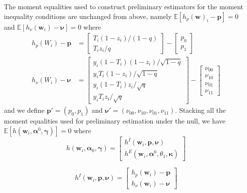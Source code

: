 \documentclass[12pt]{article}
\begin{document}
The moment equalities used to construct preliminary estimators for the moment inequality conditions are unchanged from above, namely $\mathbb{E}\left[ h_p(\mathbf{w})_i - \mathbf{p} \right] = 0$ and $\mathbb{E}\left[ h_\nu(\mathbf{w}_i) - \boldsymbol{\nu} \right] = 0$ where
\begin{align*}
h_p(W_i) - \mathbf{p} &= \left[
\begin{array}{l}
  T_i (1-z_i)/(1-q)\\ 
  T_i z_i / q 
\end{array}
\right] - \left[
\begin{array}{c}
  p_0 \\ p_1
\end{array}
\right]\\
h_\nu(W_i) - \boldsymbol{\nu} &= \left[
\begin{array}{l}
  y_i (1 - T_i) (1-z_i) / \sqrt{1-q}\\ 
  y_i T_i (1-z_i) / \sqrt{1-q} \\
  y_i (1 - T_i) z_i / \sqrt{q} \\
  y_i T_i z_i/\sqrt{q} 
\end{array}
\right] - \left[
\begin{array}{c}
  \nu_{00} \\
  \nu_{10} \\
  \nu_{01} \\
  \nu_{11} 
\end{array}
\right]
\end{align*}
and we define $\mathbf{p}'= (p_0, p_1)$ and $\boldsymbol{\nu}' = (\nu_{00}, \nu_{10}, \nu_{01}, \nu_{11})$.
Stacking all the moment equalities used for preliminary estimation under the null, we have $\mathbb{E}[h(\mathbf{w}_i, \boldsymbol{\alpha}^0, \boldsymbol{\gamma})] = 0$ where
\[
  h\left( \mathbf{w}_i, \boldsymbol{\alpha}_0,\boldsymbol{\gamma} \right) = \left[
  \begin{array}{l}
    h^I(\mathbf{w}_i, \mathbf{p}, \boldsymbol{\nu}) \\
    h^E(\mathbf{w}_i, \boldsymbol{\alpha}^0, \theta_1, \boldsymbol{\kappa}) 
  \end{array}
\right]
\]

\[
  h^I\left( \mathbf{w}_i, \mathbf{p}, \boldsymbol{\nu} \right) = \left[
  \begin{array}{l}
    h_p(\mathbf{w}_i) - \mathbf{p} \\
    h_\nu(\mathbf{w}_i) - \boldsymbol{\nu} 
  \end{array}
\right]
\]
\end{document}

